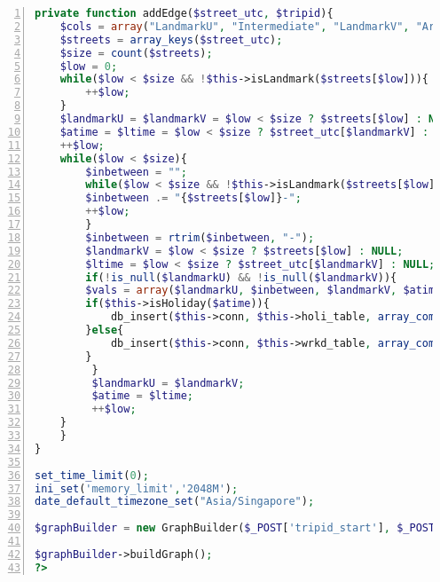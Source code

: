 \begin{lstlisting}[language = PHP, caption = {Landmark Construction}, label = {AList:ldmk_construction}, frame=single, numbers=left, stepnumber=1]
    private function addEdge($street_utc, $tripid){
	$cols = array("LandmarkU", "Intermediate", "LandmarkV", "ArrivalTime", "LeavingTime", "Duration", "TripID");
	$streets = array_keys($street_utc);
	$size = count($streets);
	$low = 0;
	while($low < $size && !$this->isLandmark($streets[$low])){
	    ++$low;
	}
	$landmarkU = $landmarkV = $low < $size ? $streets[$low] : NULL;
	$atime = $ltime = $low < $size ? $street_utc[$landmarkV] : NULL;
	++$low;
	while($low < $size){
	    $inbetween = "";
	    while($low < $size && !$this->isLandmark($streets[$low])){
		$inbetween .= "{$streets[$low]}-";
		++$low;
	    }
	    $inbetween = rtrim($inbetween, "-");
	    $landmarkV = $low < $size ? $streets[$low] : NULL;
	    $ltime = $low < $size ? $street_utc[$landmarkV] : NULL;
	    if(!is_null($landmarkU) && !is_null($landmarkV)){
		$vals = array($landmarkU, $inbetween, $landmarkV, $atime, $ltime, $ltime - $atime, $tripid);
		if($this->isHoliday($atime)){
		    db_insert($this->conn, $this->holi_table, array_combine($cols, $vals));
		}else{
		    db_insert($this->conn, $this->wrkd_table, array_combine($cols, $vals));
		}
	     }
	     $landmarkU = $landmarkV;
	     $atime = $ltime;
	     ++$low;
	}
    }
}

set_time_limit(0);
ini_set('memory_limit','2048M');
date_default_timezone_set("Asia/Singapore");

$graphBuilder = new GraphBuilder($_POST['tripid_start'], $_POST['tripid_end'], $_POST['ldmktable'], $_POST['triptable'], $_POST['ldmklimit'], $_POST['holi_table'], $_POST['wrkd_table']);

$graphBuilder->buildGraph();
?>
\end{lstlisting}